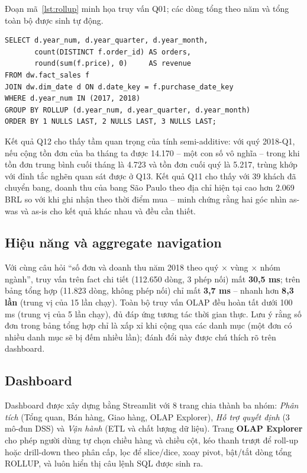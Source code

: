 \documentclass[a4paper]{article}
\DeclareRobustCommand{\code}[1]{\texttt{\detokenize{#1}}}
\begin{document}
Đoạn mã~\ref{lst:rollup} minh họa truy vấn Q01; các dòng tổng theo năm và tổng toàn bộ được \code{ROLLUP} sinh tự động.

\begin{lstlisting}[caption={Truy vấn Q01 -- Roll-up doanh thu theo phân cấp thời gian}, label={lst:rollup}]
SELECT d.year_num, d.year_quarter, d.year_month,
       count(DISTINCT f.order_id) AS orders,
       round(sum(f.price), 0)     AS revenue
FROM dw.fact_sales f
JOIN dw.dim_date d ON d.date_key = f.purchase_date_key
WHERE d.year_num IN (2017, 2018)
GROUP BY ROLLUP (d.year_num, d.year_quarter, d.year_month)
ORDER BY 1 NULLS LAST, 2 NULLS LAST, 3 NULLS LAST;
\end{lstlisting}

Kết quả Q12 cho thấy tầm quan trọng của tính semi-additive: với quý 2018-Q1, nếu cộng tồn đơn của ba tháng ta được 14.170 -- một con số vô nghĩa -- trong khi tồn đơn trung bình cuối tháng là 4.723 và tồn đơn cuối quý là 5.217, trùng khớp với đỉnh tắc nghẽn quan sát được ở Q13. Kết quả Q11 cho thấy với 39 khách đã chuyển bang, doanh thu của bang São Paulo theo địa chỉ hiện tại cao hơn 2.069 BRL so với khi ghi nhận theo thời điểm mua -- minh chứng rằng hai góc nhìn as-was và as-is cho kết quả khác nhau và đều cần thiết.

\subsection{Hiệu năng và aggregate navigation}
\label{sec:perf}
Với cùng câu hỏi ``số đơn và doanh thu năm 2018 theo quý $\times$ vùng $\times$ nhóm ngành'', truy vấn trên fact chi tiết (112.650 dòng, 3 phép nối) mất \textbf{30,5 ms}; trên bảng tổng hợp (11.823 dòng, không phép nối) chỉ mất \textbf{3,7 ms} -- nhanh hơn \textbf{8,3 lần} (trung vị của 15 lần chạy). Toàn bộ truy vấn OLAP đều hoàn tất dưới 100 ms (trung vị của 5 lần chạy), đủ đáp ứng tương tác thời gian thực. Lưu ý rằng số đơn trong bảng tổng hợp chỉ là xấp xỉ khi cộng qua các danh mục (một đơn có nhiều danh mục sẽ bị đếm nhiều lần); đánh đổi này được chú thích rõ trên dashboard.

\subsection{Dashboard}
Dashboard được xây dựng bằng Streamlit với 8 trang chia thành ba nhóm: \textit{Phân tích} (Tổng quan, Bán hàng, Giao hàng, OLAP Explorer), \textit{Hỗ trợ quyết định} (3 mô-đun DSS) và \textit{Vận hành} (ETL và chất lượng dữ liệu). Trang \textbf{OLAP Explorer} cho phép người dùng tự chọn chiều hàng và chiều cột, kéo thanh trượt để roll-up hoặc drill-down theo phân cấp, lọc để slice/dice, xoay pivot, bật/tắt dòng tổng ROLLUP, và luôn hiển thị câu lệnh SQL được sinh ra.
\end{document}
